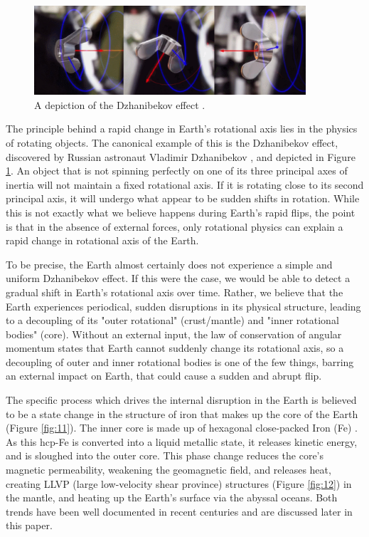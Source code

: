 \documentclass[10pt,twocolumn,letterpaper]{article}
\begin{document}
\begin{figure}
\begin{center}
\includegraphics[width=0.9\textwidth]{dzhani.jpg}
\end{center}
   \caption{A depiction of the Dzhanibekov effect \cite{28}.}
\label{fig:10}
\end{figure}

The principle behind a rapid change in Earth's rotational axis lies in the physics of rotating objects. The canonical example of this is the Dzhanibekov effect, discovered by Russian astronaut Vladimir Dzhanibekov \cite{37}, and depicted in Figure \ref{fig:10}. An object that is not spinning perfectly on one of its three principal axes of inertia will not maintain a fixed rotational axis. If it is rotating close to its second principal axis, it will undergo what appear to be sudden shifts in rotation. While this is not exactly what we believe happens during Earth's rapid flips, the point is that in the absence of external forces, only rotational physics can explain a rapid change in rotational axis of the Earth.

To be precise, the Earth almost certainly does not experience a simple and uniform Dzhanibekov effect. If this were the case, we would be able to detect a gradual shift in Earth's rotational axis over time. Rather, we believe that the Earth experiences periodical, sudden disruptions in its physical structure, leading to a decoupling of its "outer rotational" (crust/mantle) and "inner rotational bodies" (core). Without an external input, the law of conservation of angular momentum states that Earth cannot suddenly change its rotational axis, so a decoupling of outer and inner rotational bodies is one of the few things, barring an external impact on Earth, that could cause a sudden and abrupt flip.

The specific process which drives the internal disruption in the Earth is believed to be a state change in the structure of iron that makes up the core of the Earth (Figure \ref{fig:11}). The inner core is made up of hexagonal close-packed Iron (Fe) \cite{141}. As this hcp-Fe is converted into a liquid metallic state, it releases kinetic energy, and is sloughed into the outer core. This phase change reduces the core's magnetic permeability, weakening the geomagnetic field, and releases heat, creating LLVP (large low-velocity shear province) structures (Figure \ref{fig:12}) \cite{38} in the mantle, and heating up the Earth's surface via the abyssal oceans. Both trends have been well documented in recent centuries and are discussed later in this paper.
\end{document}
